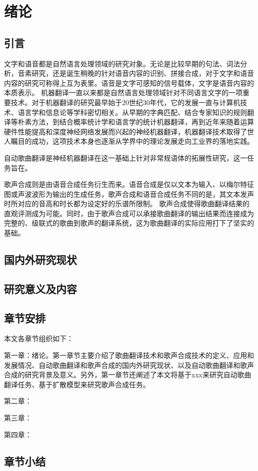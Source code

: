 \chapter{绪论}
\section{引言}
文字和语音都是自然语言处理领域的研究对象。无论是比较早期的句法、词法分析，音素研究，还是诞生稍晚的针对语音内容的识别、拼接合成，对于文字和语音内容的研究可称得上互为表里。语音是文字可感知的信号载体，文字是语音内容的本质表示。
机器翻译一直以来都是自然语言处理领域针对不同语言文字的一项重要技术。对于机器翻译的研究最早始于20世纪30年代，它的发展一直与计算机技术、语言学和信息论等学科密切相关。从早期的字典匹配、结合专家知识的规则翻译等朴素方法，到结合概率统计学和语言学的统计机器翻译，再到近年来随着运算硬件性能提高和深度神经网络发展而兴起的神经机器翻译，机器翻译技术取得了世人瞩目的成功，这项技术本身也逐渐从学界中的理论发展走向工业界的落地实践。

自动歌曲翻译是神经机器翻译在这一基础上针对非常规语体的拓展性研究，这一任务旨在。

歌声合成则是由语音合成任务衍生而来。语音合成是仅以文本为输入、以梅尔特征图或声波波形为输出的生成任务，歌声合成和语音合成任务不同的是，其文本发声时所对应的音高和时长都为设定好的乐谱所限制。
歌声合成使得歌曲翻译结果的直观评测成为可能。同时，由于歌声合成可以承接歌曲翻译的输出结果而连接成为完整的、级联式的歌曲到歌声的翻译系统，这为歌曲翻译的实际应用打下了坚实的基础。
\section{国内外研究现状}
\section{研究意义及内容}
\section{章节安排}
本文各章节组织如下：


第一章：绪论。第一章节主要介绍了歌曲翻译技术和歌声合成技术的定义、应用和发展情况、自动歌曲翻译和歌声合成的国内外研究现状、以及自动歌曲翻译和歌声合成的研究背景及意义。另外，第一章节还阐述了本文将基于xxx来研究自动歌曲翻译任务、基于扩散模型来研究歌声合成任务。

第二章：

第三章：

第四章：
\section{章节小结}
